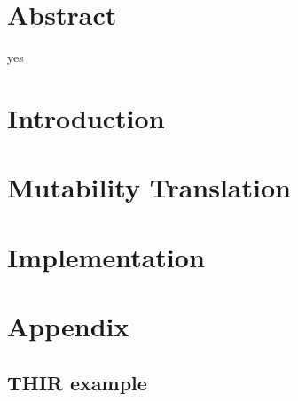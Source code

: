 \maketitle

\frontmatter
\chapter*{Abstract}
yes


\tableofcontents

\mainmatter

\chapter{Introduction}


\chapter{Mutability Translation}
\label{translation}


\chapter{Implementation}
\label{implementation}



\appendix




\chapter{Appendix}

\section{THIR example}

